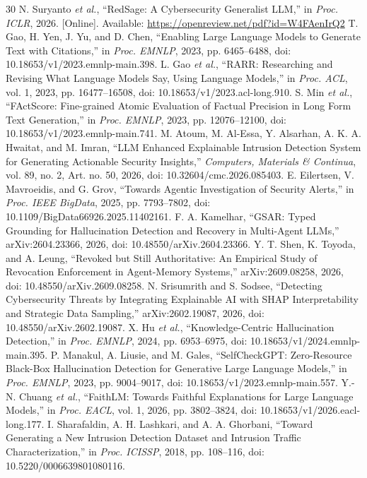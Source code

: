 \documentclass[conference,letterpaper]{IEEEtran}
\begin{document}
\begin{thebibliography}{30}
 N. Suryanto \emph{et al.}, ``RedSage: A Cybersecurity Generalist LLM,'' in \emph{Proc. ICLR}, 2026. [Online]. Available: \url{https://openreview.net/pdf?id=W4FAenIrQ2}
 T. Gao, H. Yen, J. Yu, and D. Chen, ``Enabling Large Language Models to Generate Text with Citations,'' in \emph{Proc. EMNLP}, 2023, pp. 6465--6488, doi: 10.18653/v1/2023.emnlp-main.398.
 L. Gao \emph{et al.}, ``RARR: Researching and Revising What Language Models Say, Using Language Models,'' in \emph{Proc. ACL}, vol. 1, 2023, pp. 16477--16508, doi: 10.18653/v1/2023.acl-long.910.
 S. Min \emph{et al.}, ``FActScore: Fine-grained Atomic Evaluation of Factual Precision in Long Form Text Generation,'' in \emph{Proc. EMNLP}, 2023, pp. 12076--12100, doi: 10.18653/v1/2023.emnlp-main.741.
 M. Atoum, M. Al-Essa, Y. Alsarhan, A. K. A. Hwaitat, and M. Imran, ``LLM Enhanced Explainable Intrusion Detection System for Generating Actionable Security Insights,'' \emph{Computers, Materials \& Continua}, vol. 89, no. 2, Art. no. 50, 2026, doi: 10.32604/cmc.2026.085403.
 E. Eilertsen, V. Mavroeidis, and G. Grov, ``Towards Agentic Investigation of Security Alerts,'' in \emph{Proc. IEEE BigData}, 2025, pp. 7793--7802, doi: 10.1109/BigData66926.2025.11402161.
 F. A. Kamelhar, ``GSAR: Typed Grounding for Hallucination Detection and Recovery in Multi-Agent LLMs,'' arXiv:2604.23366, 2026, doi: 10.48550/arXiv.2604.23366.
 Y. T. Shen, K. Toyoda, and A. Leung, ``Revoked but Still Authoritative: An Empirical Study of Revocation Enforcement in Agent-Memory Systems,'' arXiv:2609.08258, 2026, doi: 10.48550/arXiv.2609.08258.
 N. Srisumrith and S. Sodsee, ``Detecting Cybersecurity Threats by Integrating Explainable AI with SHAP Interpretability and Strategic Data Sampling,'' arXiv:2602.19087, 2026, doi: 10.48550/arXiv.2602.19087.
 X. Hu \emph{et al.}, ``Knowledge-Centric Hallucination Detection,'' in \emph{Proc. EMNLP}, 2024, pp. 6953--6975, doi: 10.18653/v1/2024.emnlp-main.395.
 P. Manakul, A. Liusie, and M. Gales, ``SelfCheckGPT: Zero-Resource Black-Box Hallucination Detection for Generative Large Language Models,'' in \emph{Proc. EMNLP}, 2023, pp. 9004--9017, doi: 10.18653/v1/2023.emnlp-main.557.
 Y.-N. Chuang \emph{et al.}, ``FaithLM: Towards Faithful Explanations for Large Language Models,'' in \emph{Proc. EACL}, vol. 1, 2026, pp. 3802--3824, doi: 10.18653/v1/2026.eacl-long.177.
 I. Sharafaldin, A. H. Lashkari, and A. A. Ghorbani, ``Toward Generating a New Intrusion Detection Dataset and Intrusion Traffic Characterization,'' in \emph{Proc. ICISSP}, 2018, pp. 108--116, doi: 10.5220/0006639801080116.

\end{thebibliography}
\end{document}
